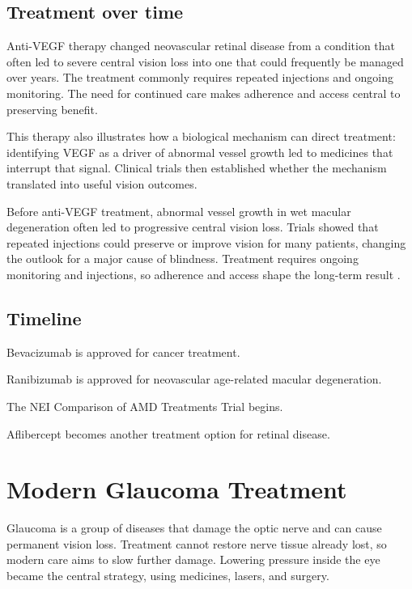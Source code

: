\documentclass[12pt,oneside]{book}
\begin{document}
\section{Treatment over time}
Anti-VEGF therapy changed neovascular retinal disease from a condition that often led to severe central vision loss into one that could frequently be managed over years. The treatment commonly requires repeated injections and ongoing monitoring. The need for continued care makes adherence and access central to preserving benefit.

This therapy also illustrates how a biological mechanism can direct treatment:
identifying VEGF as a driver of abnormal vessel growth led to medicines that
interrupt that signal. Clinical trials then established whether the mechanism
translated into useful vision outcomes.

Before anti-VEGF treatment, abnormal vessel growth in wet macular degeneration
often led to progressive central vision loss. Trials showed that repeated
injections could preserve or improve vision for many patients, changing the
outlook for a major cause of blindness. Treatment requires ongoing monitoring
and injections, so adherence and access shape the long-term result
\cite{marinaTrial,neiAntiVEGF}.

\section*{Timeline}
\begin{description}[leftmargin=2.3cm,style=nextline]
  \item[2004] Bevacizumab is approved for cancer treatment.
  \item[2006] Ranibizumab is approved for neovascular age-related macular degeneration.
  \item[2008] The NEI Comparison of AMD Treatments Trial begins.
  \item[2011] Aflibercept becomes another treatment option for retinal disease.
\end{description}
\chapter[Modern Glaucoma Treatment]{Modern Glaucoma Treatment}

Glaucoma is a group of diseases that damage the optic nerve and can cause
permanent vision loss. Treatment cannot restore nerve tissue already lost, so
modern care aims to slow further damage. Lowering pressure inside the eye
became the central strategy, using medicines, lasers, and surgery.
\end{document}
